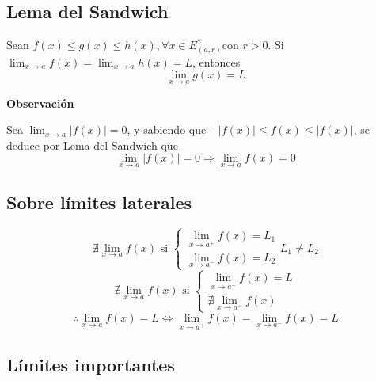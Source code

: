 \documentclass[11pt,titlepage]{article}
\newcommand{\commLim}[2]{\lim_{#1 \to #2}}
\newcommand{\littleTitle}[1]{
	\noindent \ignorespaces
	\small \textbf{#1} \normalsize
	\ignorespaces \ignorespacesafterend
}
\begin{document}
\subsection{Lema del Sandwich}
Sean $f(x) \leq g(x) \leq h(x), \forall x \in E^{\ast}_{(a,r)} \text{con } r>0.$
Si $\lim_{x \to a} f(x) = \lim_{x \to a} h(x) = L$, entonces
\begin{equation}\label{sandwich}
	\lim_{x \to a} g(x) = L
\end{equation}

\littleTitle{Observación}\par
Sea $\lim_{x \to a} |f(x)| = 0$, y sabiendo que $-|f(x)| \leq f(x) \leq |f(x)|$, se deduce por Lema del Sandwich que
\begin{equation}
	\lim_{x \to a} |f(x)| = 0 \Rightarrow \lim_{x \to a} f(x) = 0
\end{equation}

\subsection{Sobre límites laterales}
\begin{equation*}
	\nexists \lim_{x \to a} f(x) \text{ si }
	\begin{cases}
		\lim_{x \to a^{+}} f(x) = L_1 \\
		\lim_{x \to a^{-}} f(x) = L_2
	\end{cases}
	L_1 \neq L_2
\end{equation*}
\begin{equation*}
	\nexists \lim_{x \to a} f(x) \text{ si }
	\begin{cases}
		\commLim{x}{a^{+}} f(x) = L \\
		\nexists \commLim{x}{a^{-}} f(x)
	\end{cases}
\end{equation*}
\vspace{0.5cm}
\begin{equation}
	\therefore \commLim{x}{a} f(x) = L \Leftrightarrow \commLim{x}{a^{+}} f(x) = \commLim{x}{a^{-}} f(x) = L
\end{equation}

\subsection{Límites importantes}
\end{document}
